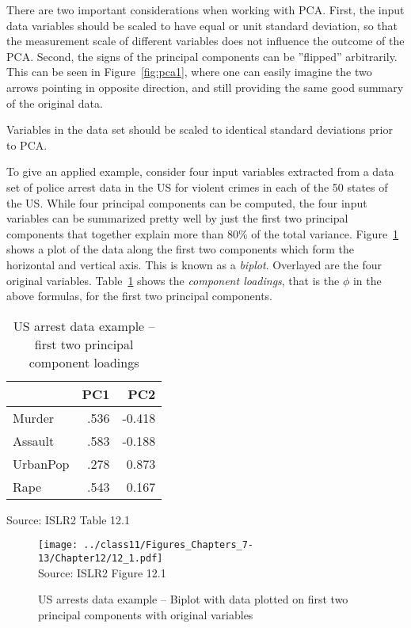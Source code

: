 There are two important considerations when working with PCA. First, the input data variables should be scaled to have equal or unit standard deviation, so that the measurement scale of different variables does not influence the outcome of the PCA. Second, the signs of the principal components can be ''flipped'' arbitrarily. This can be seen in Figure~\ref{fig:pca1}, where one can easily imagine the two arrows pointing in opposite direction, and still providing the same good summary of the original data. 

\begin{alertbox}
Variables in the data set should be scaled to identical standard deviations prior to PCA.
\end{alertbox}

To give an applied example, consider four input variables extracted from a data set of police arrest data in the US for violent crimes in each of the 50 states of the US. While four principal components can be computed, the four input variables can be summarized pretty well by just the first two principal components that together explain more than 80\% of the total variance. Figure~\ref{fig:pca2} shows a plot of the data along the first two components which form the horizontal and vertical axis. This is known as a \emph{biplot}. Overlayed are the four original variables. Table~\ref{tab:pca} shows the \emph{component loadings}, that is the $\phi$ in the above formulas, for the first two principal components. 

\begin{table}[b]
\renewcommand{\arraystretch}{1.2}
\centering
\begin{tabular}{l|r|r}
          &  PC1 & PC2 \\ \hline
Murder    & .536  & -0.418 \\
Assault   & .583  & -0.188 \\
UrbanPop  & .278  & 0.873 \\ 
Rape      & .543 & 0.167 \\ \hline
\end{tabular}

\scriptsize \vspace{\baselineskip} Source: ISLR2 Table 12.1
\caption{US arrest data example -- first two principal component loadings}
\label{tab:pca}
\end{table}

\begin{figure}
\centering
\texttt{[image: ../class11/Figures\_Chapters\_7-13/Chapter12/12\_1.pdf]} \\

\scriptsize Source: ISLR2 Figure 12.1
\caption[US arrests data example -- Biplot]{US arrests data example -- Biplot with data plotted on first two principal components with original variables}
\label{fig:pca2}
\end{figure}

